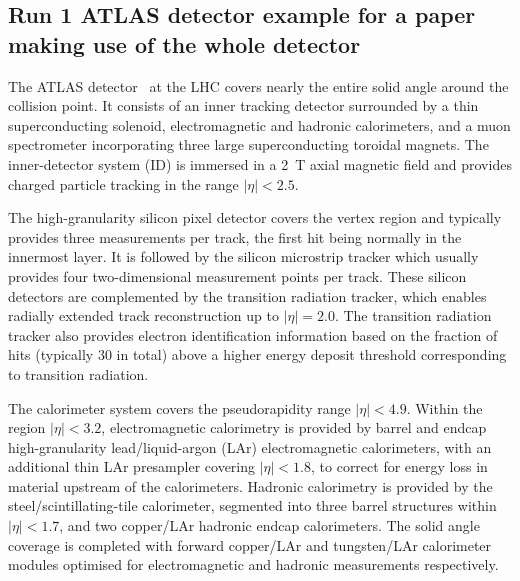 \subsection{Run 1 ATLAS detector example for a paper making use of the whole detector}
\label{sec:atlas2}

The ATLAS detector~\cite{PERF-2007-01} at the LHC covers nearly the entire solid angle around the collision point.
It consists of an inner tracking detector surrounded by a thin superconducting solenoid, electromagnetic and hadronic calorimeters,
and a muon spectrometer incorporating three large superconducting toroidal magnets.
The inner-detector system (ID) is immersed in a \SI{2}{\tesla} axial magnetic field 
and provides charged particle tracking in the range $|\eta| < 2.5$.

The high-granularity silicon pixel detector covers the vertex region and typically provides three measurements per track, 
the first hit being normally in the innermost layer.
It is followed by the silicon microstrip tracker which usually provides four two-dimensional measurement points per track.
These silicon detectors are complemented by the transition radiation tracker,
which enables radially extended track reconstruction up to $|\eta| = 2.0$. 
The transition radiation tracker also provides electron identification information 
based on the fraction of hits (typically 30 in total) above a higher energy deposit threshold corresponding to transition radiation.

The calorimeter system covers the pseudorapidity range $|\eta| < 4.9$.
Within the region $|\eta|< 3.2$, electromagnetic calorimetry is provided by barrel and 
endcap high-granularity lead/liquid-argon (LAr) electromagnetic calorimeters,
with an additional thin LAr presampler covering $|\eta| < 1.8$,
to correct for energy loss in material upstream of the calorimeters.
Hadronic calorimetry is provided by the steel/scintillating-tile calorimeter,
segmented into three barrel structures within $|\eta| < 1.7$, and two copper/LAr hadronic endcap calorimeters.
The solid angle coverage is completed with forward copper/LAr and tungsten/LAr calorimeter modules
optimised for electromagnetic and hadronic measurements respectively.

